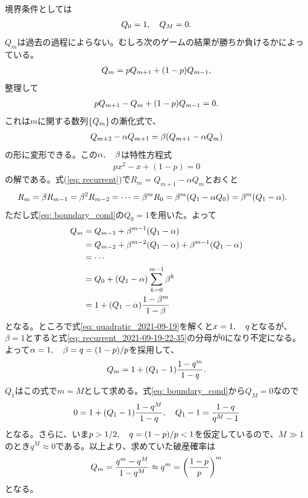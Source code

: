 \documentclass[twoside,openright,a4paper,papersize,uplatex,dvipdfmx]{jsarticle}
\begin{document}
  境界条件としては
  \begin{align}
    Q_{0} = 1 \qc Q_{M} = 0. \label{eq: boundary_cond}
  \end{align}
  $Q_{m}$は過去の過程によらない。むしろ次のゲームの結果が勝ちか負けるかによっている。
  \begin{align*} %
    Q_{m} = p Q_{m+1} + \qty(1 - p) Q_{m - 1},
  \end{align*}
  整理して
  \begin{align} \label{eq: 2021-09-28-18-33}
    p Q_{m+1} - Q_{m} + \qty(1 - p) Q_{m - 1} = 0.
  \end{align}
  これは$m$に関する数列$\qty{Q_{m}}$の漸化式で、
  \begin{align} \label{eq: recurrent}
    Q_{m+2} - \alpha Q_{m+1} =
    \beta \qty( Q_{m+1} - \alpha Q_{m})
  \end{align}
  の形に変形できる。この$\alpha \qc \beta$は特性方程式
  \begin{align} \label{eq: quadratic_2021-09-19}
    p x^{2} - x + (1 - p) = 0
  \end{align}
  の解である。式(\ref{eq: recurrent})で$R_{m} = Q_{m+1} - \alpha Q_{m}$とおくと
  \begin{align*}
    R_{m} &= \beta R_{m-1} = \beta^{2} R_{m-2} = \cdots = \beta^{m} R_{0}
    = \beta^{m} \qty( Q_{1} - \alpha Q_{0} )
    = \beta^{m} \qty( Q_{1} - \alpha ).
  \end{align*}
  ただし式\eqref{eq: boundary_cond}の$Q_{0} = 1$を用いた。よって
  \begin{align} \label{eq: recurrent_2021-09-19-22-35}
    Q_{m} &= Q_{m-1} + \beta^{m-1} \qty( Q_{1} - \alpha ) \notag \\
    &= Q_{m-2} + \beta^{m-2} \qty( Q_{1} - \alpha ) + \beta^{m-1} \qty( Q_{1} - \alpha ) \notag \\
    &= \cdots \notag \\
    &= Q_{0} + \qty( Q_{1} - \alpha ) \sum_{k = 0}^{m-1} \beta^{k} \notag \\
    &= 1 + \qty( Q_{1} - \alpha ) \frac{1 - \beta^{m}}{1 - \beta}
  \end{align}
  となる。ところで式\eqref{eq: quadratic_2021-09-19}を解くと$x = 1 \qc q$となるが、$\beta = 1$とすると式\eqref{eq: recurrent_2021-09-19-22-35}の分母が$0$になり不定になる。よって$\alpha = 1 \qc \beta = q = \qty(1 - p) / p$を採用して、
  \begin{align*}
    Q_{m} = 1 + \qty(Q_{1} - 1) \frac{1 - q^{m}}{1 - q}.
  \end{align*}
  $Q_{1}$はこの式で$m = M$として求める。式\eqref{eq: boundary_cond}から$Q_{M} = 0$なので
  \begin{align*}
    0 = 1 + \qty(Q_{1} - 1) \frac{1 - q^{M}}{1 - q}
    \qc
    Q_{1} -1 = \frac{1 - q}{q^{M} - 1}
  \end{align*}
  となる。さらに、いま$p > 1/2 \qc q = (1 - p) / p < 1$を仮定しているので、$M \gg 1$のとき$q^{M} \approx 0$である。以上より、求めていた破産確率は
  \begin{align*}
    Q_{m} = \frac{q^{m} - q^{M}}{1 - q^{M}} \approx q^{m} = \qty( \frac{1 - p}{p} )^{m}
  \end{align*}
  となる。
\end{document}

